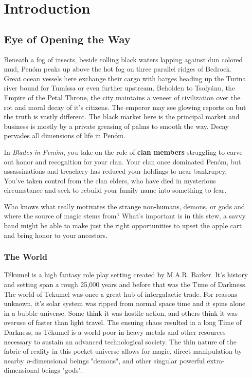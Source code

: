 \chapter{Introduction}


\section{Eye of Opening the Way}

Beneath a fog of insects, beside rolling black waters lapping against dun colored mud, Penóm peaks up above the hot fog on three parallel ridges of Bedrock. Great ocean vessels here exchange their cargo with barges heading up the Turina river bound for Tumíssa or even further upstream. Beholden to Tsolyánu, the Empire of the Petal Throne, the city maintains a veneer of civilization over the rot and moral decay of it's citizens. The emperor may see glowing reports on but the truth is vastly different. The black market here is the principal market and business is mostly by a private greasing of palms to smooth the way. Decay pervades all dimensions of life in Penóm.

In \emph{Blades in Penóm}, you take on the role of \textbf{clan members} struggling to carve out honor and recognition for your clan. Your clan once dominated Penóm, but assassinations and  treachery has reduced your holdings to near bankrupcy. You've taken control from the clan elders, who have died in mysterious circumstance and seek to rebuild your family name into something to fear.

Who knows what really motivates the strange non-humans, demons, or gods and where the source of magic stems from? What's important is in this stew, a savvy band might be able to make just the right opportunities to upset the apple cart and bring honor to your ancestors.

\subsection{The World}

Tékumel is a high fantasy role play setting created by M.A.R. Barker. It's history and setting span a rough 25,000 years and before that was the Time of Darkness.  The world of Tekumel was once a great hub of intergalactic trade. For reasons unknown, it's solar system was ripped from normal space time and it spins alone in a bubble universe. Some think it was hostile action, and others think it was overuse of faster than light travel. The ensuing chaos resulted in a long Time of Darkness, as Tékumel is a world poor in heavy metals and other resources necessary to sustain an advanced technological society. The thin nature of the fabric of reality in this pocket universe allows for magic, direct manipulation by nearby \emph{n}-dimensional beings "demons", and other singular powerful extra-dimensional beings "gods".

